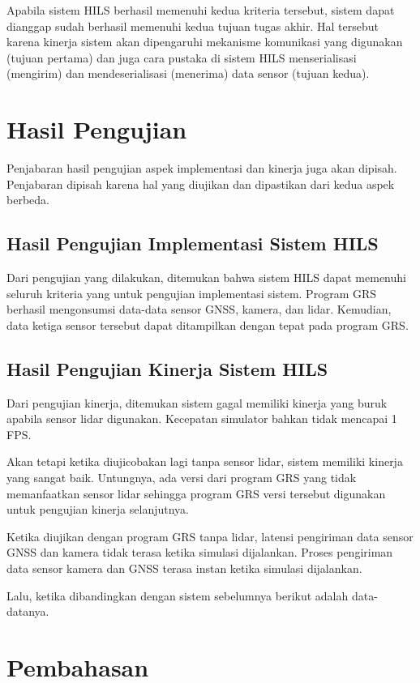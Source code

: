 Apabila sistem HILS berhasil memenuhi kedua kriteria tersebut, sistem dapat
dianggap sudah berhasil memenuhi kedua tujuan tugas akhir. Hal tersebut karena
kinerja sistem akan dipengaruhi mekanisme komunikasi yang digunakan (tujuan
pertama) dan juga cara pustaka di sistem HILS menserialisasi (mengirim) dan
mendeserialisasi (menerima) data sensor (tujuan kedua).

\section{Hasil Pengujian}

Penjabaran hasil pengujian aspek implementasi dan kinerja juga akan dipisah.
Penjabaran dipisah karena hal yang diujikan dan dipastikan dari kedua aspek
berbeda.

\subsection{Hasil Pengujian Implementasi Sistem HILS}

Dari pengujian yang dilakukan, ditemukan bahwa sistem HILS dapat memenuhi
seluruh kriteria yang untuk pengujian implementasi sistem. Program GRS berhasil
mengonsumsi data-data sensor GNSS, kamera, dan lidar. Kemudian, data ketiga
sensor tersebut dapat ditampilkan dengan tepat pada program GRS.

\subsection{Hasil Pengujian Kinerja Sistem HILS}

Dari pengujian kinerja, ditemukan sistem gagal memiliki kinerja yang buruk
apabila sensor lidar digunakan. Kecepatan simulator bahkan tidak mencapai 1 FPS.

Akan tetapi ketika diujicobakan lagi tanpa sensor lidar, sistem memiliki kinerja
yang sangat baik. Untungnya, ada versi dari program GRS yang tidak memanfaatkan
sensor lidar sehingga program GRS versi tersebut digunakan untuk pengujian
kinerja selanjutnya.

Ketika diujikan dengan program GRS tanpa lidar, latensi pengiriman data sensor
GNSS dan kamera tidak terasa ketika simulasi dijalankan. Proses pengiriman data
sensor kamera dan GNSS terasa instan ketika simulasi dijalankan.

Lalu, ketika dibandingkan dengan sistem sebelumnya berikut adalah data-datanya.

\section{Pembahasan}
\blindtext
